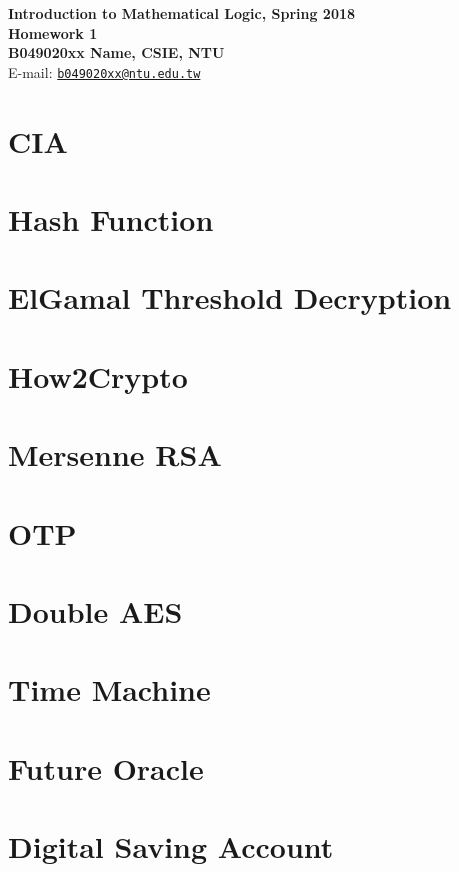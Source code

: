 \documentclass[12pt,a4paper]{article}
\begin{document}
\begin{center}
\textbf{\Large Introduction to Mathematical Logic, Spring 2018\\}
\textbf{\Large Homework 1\\} 
\vspace{5pt}
\textbf{B049020xx Name, CSIE, NTU}\\
E-mail: \href{mailto:b049020xx@ntu.edu.tw}{\texttt{b049020xx@ntu.edu.tw}}\\

\end{center}
\vspace{10pt}
\section{CIA}
\section{Hash Function}
\section{ElGamal Threshold Decryption}
\section{How2Crypto}
\section{Mersenne RSA}
\section{OTP}
\section{Double AES}
\section{Time Machine}
\section{Future Oracle}
\section{Digital Saving Account}
\end{document}
